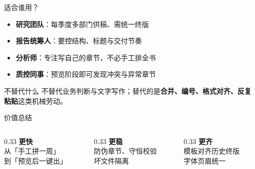 \documentclass[aspectratio=169,10pt,UTF8]{ctexbeamer}
\begin{document}
\begin{frame}{适合谁用？}
  \begin{itemize}
    \item \textbf{研究团队}：每季度多部门供稿、需统一终版
    \item \textbf{报告统筹人}：要控结构、标题与交付节奏
    \item \textbf{分析师}：专注写自己的章节，不必手工排全书
    \item \textbf{质控同事}：预览阶段即可发现冲突与异常章节
  \end{itemize}
  \vspace{0.8em}
  \begin{exampleblock}{不替代什么}
    不替代业务判断与文字写作；替代的是\textbf{合并、编号、格式对齐、反复粘贴}这类机械劳动。
  \end{exampleblock}
\end{frame}

\begin{frame}{价值总结}
  \begin{columns}[T]
    \begin{column}{0.33\textwidth}
      \centering
      {\color{BrandBlue}\Large\bfseries 更快}\\[0.4em]
      从「手工拼一周」\\到「预览后一键出」
    \end{column}
    \begin{column}{0.33\textwidth}
      \centering
      {\color{BrandBlue}\Large\bfseries 更稳}\\[0.4em]
      防伪章节、守恒校验\\坏文件隔离
    \end{column}
    \begin{column}{0.33\textwidth}
      \centering
      {\color{BrandBlue}\Large\bfseries 更齐}\\[0.4em]
      模板对齐历史终版\\字体页眉统一
    \end{column}
  \end{columns}
  \vspace{1.4em}
  \begin{center}
  \end{center}
\end{frame}
\end{document}
